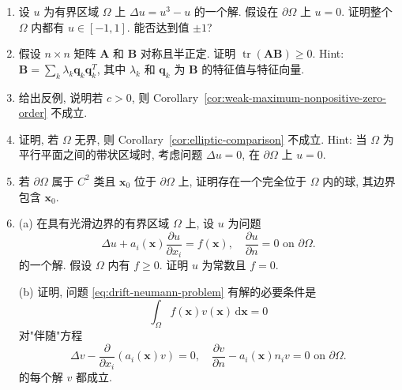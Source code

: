 \begin{enumerate}[label=\thesection.\arabic*.,ref=\thesection.\arabic*,start=1,series=book-problems]

\item\label{ex:semilinear-cubic-maximum-bound} 设 $u$ 为有界区域 $\Omega$ 上 $\Delta u=u^3-u$ 的一个解. 假设在 $\partial\Omega$ 上 $u=0$. 证明整个 $\Omega$ 内都有 $u\in[-1,1]$. 能否达到值 $\pm1$?

\item\label{ex:trace-positive-semidefinite-product} 假设 $n\times n$ 矩阵 $\bm{A}$ 和 $\bm{B}$ 对称且半正定. 证明 $\operatorname{tr}(\bm{A}\bm{B})\geq0$. Hint: $\bm{B}=\sum_k\lambda_k\bm{q}_k\bm{q}_k^T$, 其中 $\lambda_k$ 和 $\bm{q}_k$ 为 $\bm{B}$ 的特征值与特征向量.

\item\label{ex:weak-maximum-positive-zero-order-counterexample} 给出反例, 说明若 $c>0$, 则 Corollary~\ref{cor:weak-maximum-nonpositive-zero-order} 不成立.

\item\label{ex:unbounded-elliptic-comparison-counterexample} 证明, 若 $\Omega$ 无界, 则 Corollary~\ref{cor:elliptic-comparison} 不成立. Hint: 当 $\Omega$ 为平行平面之间的带状区域时, 考虑问题 $\Delta u=0$, 在 $\partial\Omega$ 上 $u=0$.

\item\label{ex:interior-tangent-ball} 若 $\partial\Omega$ 属于 $C^2$ 类且 $\bm{x}_0$ 位于 $\partial\Omega$ 上, 证明存在一个完全位于 $\Omega$ 内的球, 其边界包含 $\bm{x}_0$.

\item\label{ex:drift-neumann-adjoint-solvability} (a) 在具有光滑边界的有界区域 $\Omega$ 上, 设 $u$ 为问题
\begin{equation}\label{eq:drift-neumann-problem}
\Delta u+a_i(\bm{x})\dfrac{\partial u}{\partial x_i}=f(\bm{x}),\quad\dfrac{\partial u}{\partial n}=0\text{ on }\partial\Omega.
\end{equation}
的一个解. 假设 $\Omega$ 内有 $f\geq0$. 证明 $u$ 为常数且 $f=0$.

(b) 证明, 问题 \eqref{eq:drift-neumann-problem} 有解的必要条件是
\begin{equation}\label{eq:drift-neumann-adjoint-compatibility}
\int_\Omega f(\bm{x})v(\bm{x})\,\mathrm{d}\bm{x}=0
\end{equation}
对"伴随"方程
\begin{equation}\label{eq:drift-neumann-adjoint-equation}
\Delta v-\dfrac{\partial}{\partial x_i}\left(a_i(\bm{x})v\right)=0,\quad\dfrac{\partial v}{\partial n}-a_i(\bm{x})n_iv=0\text{ on }\partial\Omega.
\end{equation}
的每个解 $v$ 都成立.


\end{enumerate}

